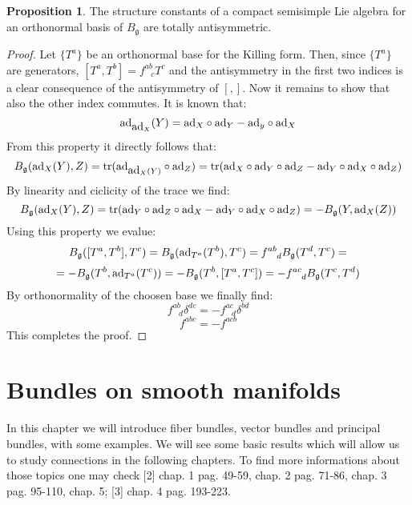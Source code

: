 \documentclass[12pt,a4paper]{report}
\theoremstyle{definition}
\theoremstyle{Theorem}
\newtheorem{Prop}[Def]{Proposition}
\theoremstyle{definition}
\theoremstyle{definition}
\begin{document}
			\begin{Prop}
				The structure constants of a compact semisimple Lie algebra for an orthonormal basis of $B_\mathfrak{g}$ are totally antisymmetric.
			\end{Prop}
			\begin{proof}
				Let $\{T^a\}$ be an orthonormal base for the Killing form. Then, since $\{T^a\}$ are generators, $[T^a,T^b]=f^{ab}_{\hspace{9pt}c}T^c$ and the antisymmetry in the first two indices is a clear consequence of the antisymmetry of $[,]$. Now it remains to show that also the other index commutes. It is known that:
				$$\hbox{ad}_{\hbox{ad}_X}(Y)=\hbox{ad}_X\circ \hbox{ad}_Y-\hbox{ad}_y\circ \hbox{ad}_X$$
				From this property it directly follows that:
				$$B_\mathfrak{g}(\hbox{ad}_X(Y),Z)=\hbox{tr}(\hbox{ad}_{\hbox{ad}_X(Y)}\circ \hbox{ad}_Z)=\hbox{tr}(\hbox{ad}_X\circ \hbox{ad}_Y\circ \hbox{ad}_Z-\hbox{ad}_Y\circ\hbox{ad}_X\circ \hbox{ad}_Z)$$
				By linearity and ciclicity of the trace we find:
				$$B_\mathfrak{g}(\hbox{ad}_X(Y),Z)=\hbox{tr}(\hbox{ad}_Y\circ \hbox{ad}_Z\circ \hbox{ad}_X-\hbox{ad}_Y\circ\hbox{ad}_X\circ \hbox{ad}_Z)=-B_\mathfrak{g}(Y,\hbox{ad}_X(Z))$$
				Using this property we evalue:
				$$B_\mathfrak{g}([T^a,T^b],T^c)=B_\mathfrak{g}(\hbox{ad}_{T^a}(T^b),T^c)=f^{ab}_{\hspace{9pt}d}B_\mathfrak{g}(T^d,T^c)=$$
				$$=-B_\mathfrak{g}(T^b,\hbox{ad}_{T^a}(T^c))=-B_\mathfrak{g}(T^b,[T^a,T^c])=-f^{ac}_{\hspace{9pt}d}B_\mathfrak{g}(T^c,T^d)$$
				By orthonormality of the choosen base we finally find:
				$$f^{ab}_{\hspace{9pt}d}\delta^{dc}=-f^{ac}_{\hspace{9pt}d}\delta^{bd}$$
				$$f^{abc}=-f^{acb}$$
				This completes the proof.
			\end{proof}
		\chapter{Bundles on smooth manifolds}
		In this chapter we will introduce fiber bundles, vector bundles and principal bundles, with some examples. We will see some basic results which will allow us to study connections in the following chapters. To find more informations about those topics one may check [2] chap. 1 pag. 49-59, chap. 2 pag. 71-86, chap. 3 pag. 95-110, chap. 5; [3] chap. 4 pag. 193-223.
\end{document}
